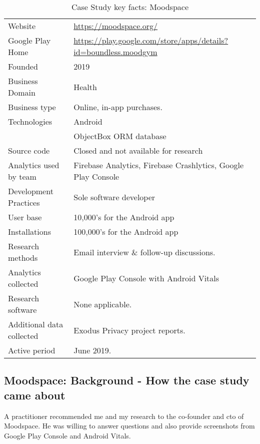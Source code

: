 {\renewcommand{\arraystretch}{0.8}%
\begin{table*}
    \centering
    \small
    \setlength{\tabcolsep}{6pt}
    \begin{tabular}{lp{9cm}}
       \toprule
       Website &\url{https://moodspace.org/} \\
       Google Play Home & \url{https://play.google.com/store/apps/details?id=boundless.moodgym} \\
       Founded & 2019 \\
       Business Domain & Health \\
       Business type & Online, in-app purchases. \\
       Technologies  & Android \\
       & ObjectBox ORM database \\
       Source code  &Closed and not available for research \\
       Analytics used by team & Firebase Analytics, Firebase Crashlytics, Google Play Console \\
       Development Practices & Sole software developer \\
       \midrule
       User base & 10,000's for the Android app \\
       Installations & 100,000's for the Android app \\
       \midrule
       Research methods &Email interview \& follow-up discussions. \\
       Analytics collected &Google Play Console with Android Vitals \\
       Research software & None applicable. \\
       Additional data collected &Exodus Privacy project reports. \\
       Active period & June 2019. \\
       \bottomrule
    \end{tabular}
    \caption{Case Study key facts: Moodspace}
    \label{tab:blank_case_study_anaytics_overview}
\end{table*}
}

\subsection{Moodspace: Background - How the case study came about}
A practitioner recommended me and my research to the co-founder and \acrshort{cto} of Moodspace. He was willing to answer questions and also provide screenshots from Google Play Console and Android Vitals.


